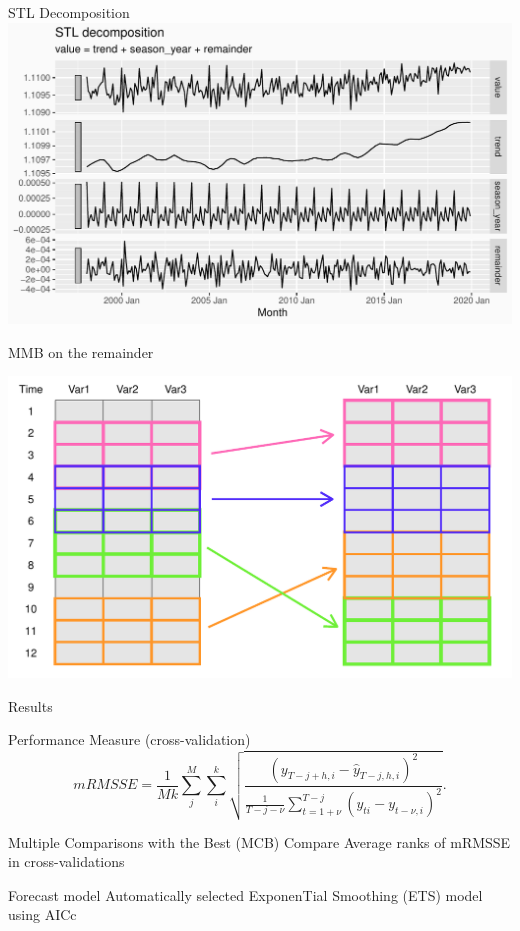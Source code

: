 \documentclass[14pt,ignorenonframetext,]{beamer}
\begin{document}
\begin{frame}{STL Decomposition}
\protect\hypertarget{stl-decomposition}{}
\includegraphics[width=\linewidth]{plot/p_stl}
\end{frame}

\begin{frame}{MMB on the remainder}
\protect\hypertarget{mmb-on-the-remainder}{}
\begin{center}
\includegraphics[width=\linewidth]{plot/p_mmb}
\end{center}
\end{frame}

\begin{frame}{Results}
\protect\hypertarget{results}{}
\begin{block}{Performance Measure (cross-validation)}
\protect\hypertarget{performance-measure-cross-validation}{}
\[
mRMSSE = \frac{1}{Mk}\sum^{M}_j\sum^{k}_i
\sqrt{\frac
{(y_{T-j+h,i}-\hat{y}_{T-j, h,i})^2}
{\frac{1}{T-j-\nu}\sum^{T-j}_{t={1+\nu}}(y_{ti} - y_{t-\nu, i})^2}}.
\]
\end{block}

\begin{block}{Multiple Comparisons with the Best (MCB)}
\protect\hypertarget{multiple-comparisons-with-the-best-mcb}{}
Compare Average ranks of mRMSSE in cross-validations
\citep{Koning2005-ch}
\end{block}

\begin{block}{Forecast model}
\protect\hypertarget{forecast-model-1}{}
Automatically selected ExponenTial Smoothing (ETS) model using AICc
\end{block}
\end{frame}
\end{document}
